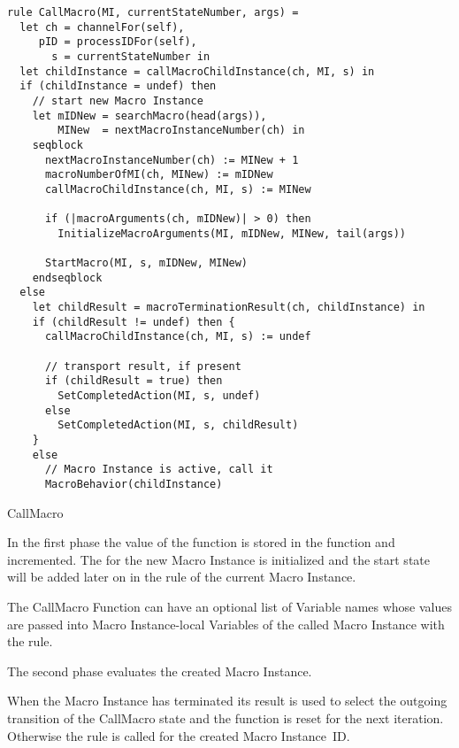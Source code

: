 \begin{listing}[H]
\begin{verbatim}
rule CallMacro(MI, currentStateNumber, args) =
  let ch = channelFor(self),
     pID = processIDFor(self),
       s = currentStateNumber in
  let childInstance = callMacroChildInstance(ch, MI, s) in
  if (childInstance = undef) then
    // start new Macro Instance
    let mIDNew = searchMacro(head(args)),
        MINew  = nextMacroInstanceNumber(ch) in
    seqblock
      nextMacroInstanceNumber(ch) := MINew + 1
      macroNumberOfMI(ch, MINew) := mIDNew
      callMacroChildInstance(ch, MI, s) := MINew

      if (|macroArguments(ch, mIDNew)| > 0) then
        InitializeMacroArguments(MI, mIDNew, MINew, tail(args))

      StartMacro(MI, s, mIDNew, MINew)
    endseqblock
  else
    let childResult = macroTerminationResult(ch, childInstance) in
    if (childResult != undef) then {
      callMacroChildInstance(ch, MI, s) := undef

      // transport result, if present
      if (childResult = true) then
        SetCompletedAction(MI, s, undef)
      else
        SetCompletedAction(MI, s, childResult)
    }
    else
      // Macro Instance is active, call it
      MacroBehavior(childInstance)
\end{verbatim}
\caption{CallMacro}
\label{lst:shortasm:CallMacro}
\end{listing}


In the first phase the value of the 
function is stored in the  function and
incremented. The  for the new Macro Instance is
initialized and the start state will be added later on in the
 rule of the current Macro Instance.

The CallMacro Function can have an optional list of Variable names whose values
are passed into Macro Instance-local Variables of the called Macro Instance with
the  rule.

The second phase evaluates the created Macro Instance.

When the Macro Instance has terminated its result is used to select the
outgoing transition of the CallMacro state and the 
function is reset for the next iteration. Otherwise the
 rule is called for the created Macro Instance~ID.



